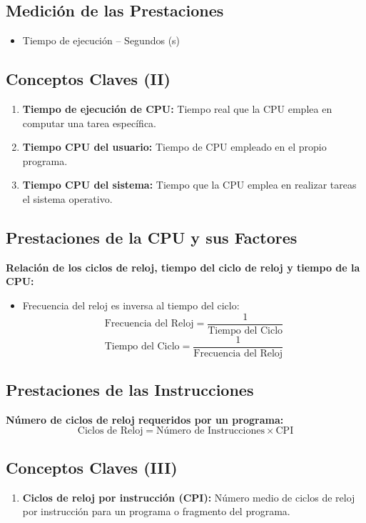 \documentclass{article}
\begin{document}
	\subsection*{Medición de las Prestaciones}
	\begin{itemize}
		\item Tiempo de ejecución – Segundos (s)
	\end{itemize}
	
	\subsection*{Conceptos Claves (II)}
	\begin{enumerate}[label=\arabic*)]
		\item \textbf{Tiempo de ejecución de CPU:} Tiempo real que la CPU emplea en computar una tarea específica.
		\item \textbf{Tiempo CPU del usuario:} Tiempo de CPU empleado en el propio programa.
		\item \textbf{Tiempo CPU del sistema:} Tiempo que la CPU emplea en realizar tareas el sistema operativo.
	\end{enumerate}
	
	\subsection*{Prestaciones de la CPU y sus Factores}
	\textbf{Relación de los ciclos de reloj, tiempo del ciclo de reloj y tiempo de la CPU:}
	\begin{itemize}[noitemsep]
		\item Frecuencia del reloj es inversa al tiempo del ciclo:
		\[ \text{Frecuencia del Reloj} = \frac{1}{\text{Tiempo del Ciclo}} \]
		\[ \text{Tiempo del Ciclo} = \frac{1}{\text{Frecuencia del Reloj}} \]
	\end{itemize}
	
	\subsection*{Prestaciones de las Instrucciones}
	\textbf{Número de ciclos de reloj requeridos por un programa:}
	\[ \text{Ciclos de Reloj} = \text{Número de Instrucciones} \times \text{CPI} \]
	
	\subsection*{Conceptos Claves (III)}
	\begin{enumerate}[label=\arabic*)]
		\item \textbf{Ciclos de reloj por instrucción (CPI):} Número medio de ciclos de reloj por instrucción para un programa o fragmento del programa.
	\end{enumerate}
	
\end{document}
